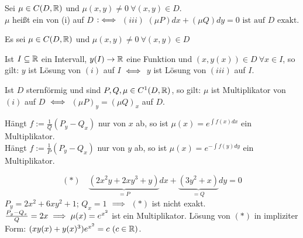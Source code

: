 \documentclass{article}
\begin{document}
\begin{definition}
Sei $\mu \in C(D,\mathbb{R})$ und $\mu(x,y)\ne0 \ \forall(x,y)\in  D$.\\
$\mu$ heißt ein  von (i) auf $D$
$:\iff$ $(iii)$ $(\mu P)dx + (\mu Q)dy = 0 \text{ ist auf }D\text{ exakt.}$
\end{definition}

\begin{bemerkung}
Es sei $\mu\in C(D,\mathbb{R})$ und $\mu(x,y) \ne 0 \ \forall(x,y)\in D$
\begin{liste}
\item Ist $I\subseteq \mathbb{R}$ ein Intervall, $y(I)\to\mathbb{R}$ eine Funktion und $(x,y(x)) \in D \ \forall x\in I$, so gilt: $y$ ist Lösung von $(i)$ auf $I$ $\iff$ $y$ ist Lösung von $(iii)$ auf $I$.
\item Ist $D$ sternförmig und sind $P,Q,\mu\in C^1(D,\mathbb{R})$, so gilt: $\mu$ ist Multiplikator von $(i)$ auf $D$ $\iff$ $(\mu P)_y = (\mu Q)_x$ auf $D$.
\item Hängt $f:=\frac1Q(P_y-Q_x)$ nur von $x$ ab, so ist $\mu(x)=e^{\int{f(x)} dx}$ ein Multiplikator.\\
Hängt $f:=\frac1P(P_y-Q_x)$ nur von $y$ ab, so ist $\mu(x)=e^{-\int{f(y)} dy}$ ein Multiplikator.
\begin{beispiel}
$$(*)\quad \underbrace{(2x^2y+2xy^3+y)}_{=P} dx + \underbrace{(3y^2+x)}_{=Q} dy = 0$$
$P_y=2x^2+6xy^2+1$; $Q_x=1$ $\implies$ $(*)$ ist nicht exakt. $\frac{P_y-Q_x}{Q} = 2x \implies \mu(x)=e^{x^2}$ ist ein Multiplikator. Lösung von $(*)$ in impliziter Form: $(xy(x) + y(x)^3)e^{x^2}=c\ (c\in\mathbb{R})$.
\end{beispiel}
\end{liste}
\end{bemerkung}
\end{document}
